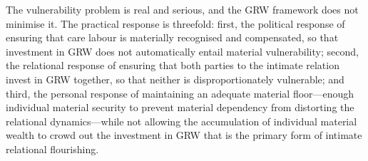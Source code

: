 The vulnerability problem is real and serious, and the GRW framework does not minimise it. The practical response is threefold: first, the political response of ensuring that care labour is materially recognised and compensated, so that investment in GRW does not automatically entail material vulnerability; second, the relational response of ensuring that both parties to the intimate relation invest in GRW together, so that neither is disproportionately vulnerable; and third, the personal response of maintaining an adequate material floor---enough individual material security to prevent material dependency from distorting the relational dynamics---while not allowing the accumulation of individual material wealth to crowd out the investment in GRW that is the primary form of intimate relational flourishing.
